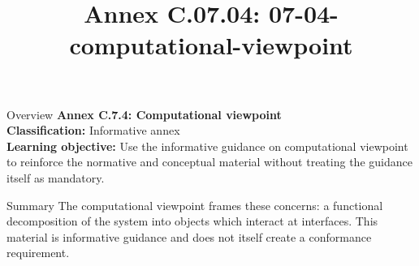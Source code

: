 \documentclass[10pt,letterpaper]{article}
\title{Annex C.07.04: 07-04-computational-viewpoint}
\author{}
\date{}
\begin{document}
\maketitle
\begin{CornellOverviewBox}{Overview}
{\Large\bfseries\textcolor{CNavy}{Annex C.7.4: Computational viewpoint}}\\[3pt]
{\small\textbf{Classification:} Informative annex}\\
{\small\textbf{Learning objective:} Use the informative guidance on computational viewpoint to reinforce the normative and conceptual material without treating the guidance itself as mandatory.}
\end{CornellOverviewBox}
\vspace{3pt}

\begin{CornellNotesTable}
\end{CornellNotesTable}


\begin{CornellSummaryBox}{Summary}
The computational viewpoint frames these concerns: a functional decomposition of the system into objects which interact at interfaces. This material is informative guidance and does not itself create a conformance requirement.
\end{CornellSummaryBox}
\end{document}
